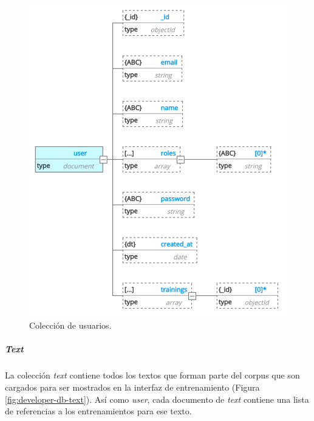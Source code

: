 \documentclass[12pt,a4paper,]{scrartcl}
\let\oldsubparagraph\subparagraph
\renewcommand{\subparagraph}[1]{\oldsubparagraph{#1}\mbox{}}
\begin{document}
\begin{figure}[H]

{\centering \includegraphics{assets/developer/db-user.pdf} 

}

\caption{Colección de usuarios.}\label{fig:developer-db-user}
\end{figure}

\hypertarget{text}{%
\subparagraph{\texorpdfstring{\emph{Text}}{Text}}\label{text}}

La colección \emph{text} contiene todos los textos que forman parte del corpus que son cargados para ser mostrados en la interfaz de entrenamiento (Figura \ref{fig:developer-db-text}). Así como \emph{user}, cada documento de \emph{text} contiene una lista de referencias a los entrenamientos para ese texto.
\end{document}
